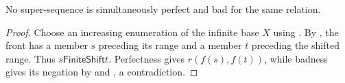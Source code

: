 \begin{lemma}
No super-sequence is simultaneously perfect and bad for the same relation.
\end{lemma}
\begin{proof}
Choose an increasing enumeration of the infinite base $X$ using
.  By
, the front has a member $s$ preceding its range
and a member $t$ preceding the shifted range.  Thus
$s\mathrel{\mathsf{FiniteShift}}t$.  Perfectness gives
$r(f(s),f(t))$, while badness gives its negation by
 and , a
contradiction.
\end{proof}
